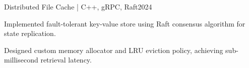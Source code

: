 \begin{cvproject}{Distributed File Cache | C++, gRPC, Raft}{2024}
    \item Implemented fault-tolerant key-value store using Raft consensus algorithm for state replication.
    \item Designed custom memory allocator and LRU eviction policy, achieving sub-millisecond retrieval latency.
\end{cvproject}
